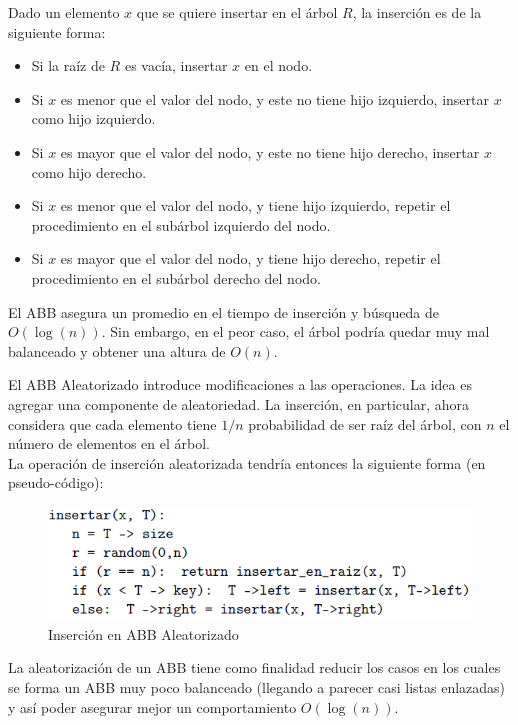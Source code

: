 \documentclass[11pt,letterpaper]{article}
\begin{document}
Dado un elemento $x$ que se quiere insertar en el árbol $R$, la inserción es de la siguiente forma:
\begin{itemize}
\item Si la raíz de $R$ es vacía, insertar $x$ en el nodo.
\item Si $x$ es menor que el valor del nodo, y este no tiene hijo izquierdo, insertar $x$ como hijo izquierdo.
\item Si $x$ es mayor que el valor del nodo, y este no tiene hijo derecho, insertar $x$ como hijo derecho.
\item Si $x$ es menor que el valor del nodo, y tiene hijo izquierdo, repetir el procedimiento en el subárbol izquierdo del nodo.
\item Si $x$ es mayor que el valor del nodo, y tiene hijo derecho, repetir el procedimiento en el subárbol derecho del nodo.
\end{itemize}

El ABB asegura un promedio en el tiempo de inserción y búsqueda de $O(\log(n))$. Sin embargo, en el peor caso, el árbol podría quedar muy mal balanceado y obtener una altura de $O(n)$.

\newpage

El ABB Aleatorizado introduce modificaciones a las operaciones. La idea es agregar una componente de aleatoriedad. La inserción, en particular, ahora considera que cada elemento tiene $1/n$ probabilidad de ser raíz del árbol, con $n$ el número de elementos en el árbol.\\

La operación de inserción aleatorizada tendría entonces la siguiente forma (en pseudo-código):

\begin{figure}[htb]
	\centerline{\includegraphics[scale=0.6]{img/insertar.png}}
	\caption{Inserción en ABB Aleatorizado} \label{insercionrandom}
\end{figure}

La aleatorización de un ABB tiene como finalidad reducir los casos en los cuales se forma un ABB muy poco balanceado (llegando a parecer casi listas enlazadas) y así poder asegurar mejor un comportamiento $O(\log(n))$.\\
\end{document}

